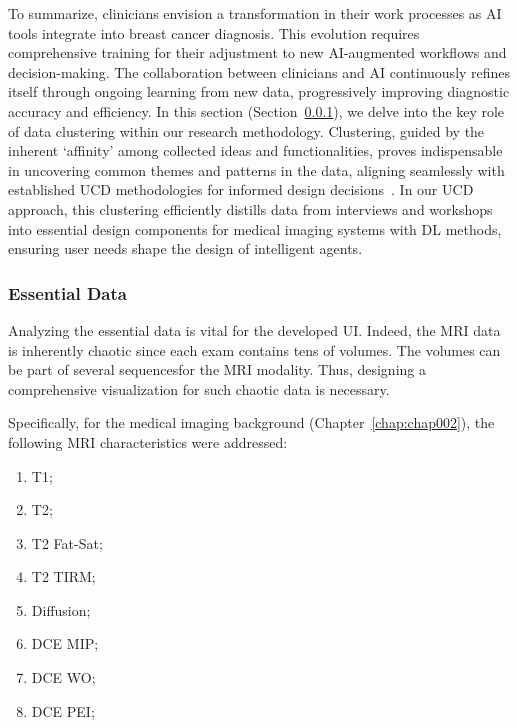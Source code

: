 \textcolor{revised}{To summarize, clinicians envision a transformation in their work processes as \ac{AI} tools integrate into breast cancer diagnosis.
This evolution requires comprehensive training for their adjustment to new \acs{AI}-augmented workflows and decision-making.
The collaboration between clinicians and \ac{AI} continuously refines itself through ongoing learning from new data, progressively improving diagnostic accuracy and efficiency.
In this section (Section~\ref{sec:chap005003003004}), we delve into the key role of data clustering within our research methodology.
Clustering, guided by the inherent `affinity' among collected ideas and functionalities, proves indispensable in uncovering common themes and patterns in the data, aligning seamlessly with established \ac{UCD} methodologies for informed design decisions~\cite{10.1145/3290605.3300234, 10.1145/3313831.3376718}.
In our \ac{UCD} approach, this clustering efficiently distills data from interviews and workshops into essential design components for medical imaging systems with \ac{DL} methods, ensuring user needs shape the design of intelligent agents.}

\subsubsection{Essential Data}
\label{sec:chap005003003004}

Analyzing the essential data is vital for the developed \ac{UI}.
Indeed, the \ac{MRI} data is inherently chaotic since each exam contains tens of volumes.
The volumes can be part of several sequences\footnotemark[9] for the \ac{MRI} modality.
Thus, designing a comprehensive visualization for such chaotic data is necessary.

\vspace{1.00mm}

\noindent
Specifically, for the medical imaging background (Chapter~\ref{chap:chap002}), the following \ac{MRI} characteristics were addressed:

\vspace{0.05mm}

\begin{multicols}{4}
\begin{enumerate}
\item T1;
\item T2;
\item T2 Fat-Sat;
\item T2 TIRM;
\item Diffusion;
\item DCE MIP;
\item DCE WO;
\item DCE PEI;
\end{enumerate}
\end{multicols}


